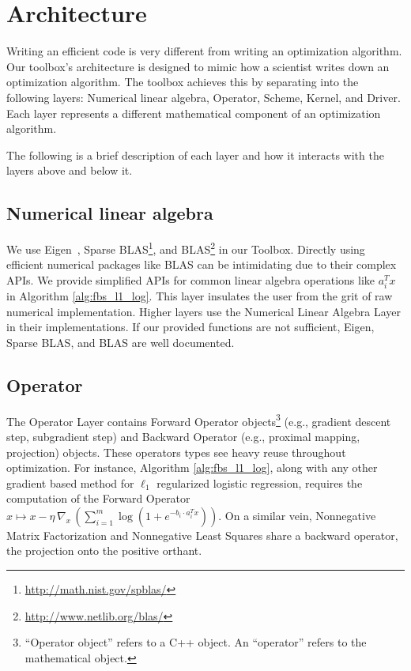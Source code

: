 \section{Architecture}


Writing an efficient code is very different from writing an optimization algorithm.
Our toolbox's architecture is designed to mimic how a scientist writes down an optimization algorithm.
The toolbox achieves this by separating into the following layers: Numerical linear algebra, Operator, Scheme, Kernel, and Driver.
Each layer represents a different mathematical component of an optimization algorithm.


The following is a brief description of each layer and how it interacts with the layers above and below it.

\subsection{Numerical linear algebra}

We use Eigen~\citep{eigenweb}, Sparse BLAS\footnote{\url{http://math.nist.gov/spblas/}}, and BLAS\footnote{\url{http://www.netlib.org/blas/}} in our Toolbox.
Directly using efficient numerical packages like BLAS can be intimidating due to their complex APIs. We provide simplified APIs for common linear algebra operations like $a_i^T x$ in Algorithm \ref{alg:fbs_l1_log}. This layer insulates the user from the grit of raw numerical implementation. Higher layers use the Numerical Linear Algebra Layer in their implementations.
If our provided functions are not sufficient, Eigen, Sparse BLAS, and BLAS are well documented.

\subsection{Operator}

The Operator Layer contains Forward Operator objects\footnote{``Operator object'' refers to a C++ object. An ``operator'' refers to the mathematical object.} (e.g., gradient descent step, subgradient step) and Backward Operator (e.g., proximal mapping, projection) objects. These operators types see heavy reuse throughout optimization.
For instance, Algorithm \ref{alg:fbs_l1_log}, along with any other gradient based method for $\ell_1$ regularized logistic regression, requires the computation of the Forward Operator $x \mapsto x - \eta \, \nabla_x \,(\sum_{i = 1}^m \log (1 + e^{-b_i \cdot a_i^T x}))$. On a similar vein, Nonnegative Matrix Factorization and Nonnegative Least Squares share a backward operator, the projection onto the positive orthant.

